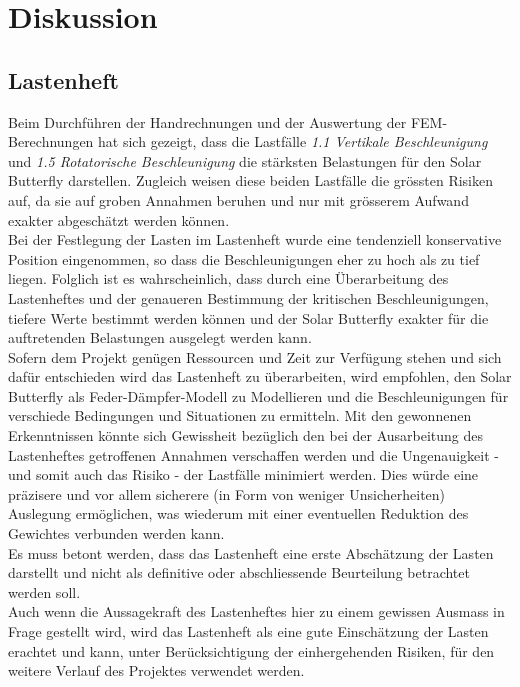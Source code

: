 \section{Diskussion}
\label{Diskussion}

\subsection{Lastenheft}
Beim Durchführen der Handrechnungen und der Auswertung der FEM-Berechnungen hat sich gezeigt, dass die Lastfälle \emph{1.1 Vertikale Beschleunigung} und \emph{1.5 Rotatorische Beschleunigung} die stärksten Belastungen für den Solar Butterfly darstellen. Zugleich weisen diese beiden Lastfälle die grössten Risiken auf, da sie auf groben Annahmen beruhen und nur mit grösserem Aufwand exakter abgeschätzt werden können.\\
Bei der Festlegung der Lasten im Lastenheft wurde eine tendenziell konservative Position eingenommen, so dass die Beschleunigungen eher zu hoch als zu tief liegen. Folglich ist es wahrscheinlich, dass durch eine Überarbeitung des Lastenheftes und der genaueren Bestimmung der kritischen Beschleunigungen, tiefere Werte bestimmt werden können und der Solar Butterfly exakter für die auftretenden Belastungen ausgelegt werden kann.\\
Sofern dem Projekt genügen Ressourcen und Zeit zur Verfügung stehen und sich dafür entschieden wird das Lastenheft zu überarbeiten, wird empfohlen, den Solar Butterfly als Feder-Dämpfer-Modell zu Modellieren und die Beschleunigungen für verschiede Bedingungen und Situationen zu ermitteln. Mit den gewonnenen Erkenntnissen könnte sich Gewissheit bezüglich den bei der Ausarbeitung des Lastenheftes getroffenen Annahmen verschaffen werden und die Ungenauigkeit - und somit auch das Risiko - der Lastfälle minimiert werden. Dies würde eine präzisere und vor allem sicherere (in Form von weniger Unsicherheiten) Auslegung ermöglichen, was wiederum mit einer eventuellen Reduktion des Gewichtes verbunden werden kann.\\
Es muss betont werden, dass das Lastenheft eine erste Abschätzung der Lasten darstellt und nicht als definitive oder abschliessende Beurteilung betrachtet werden soll.\\
Auch wenn die Aussagekraft des Lastenheftes hier zu einem gewissen Ausmass in Frage gestellt wird, wird das Lastenheft als eine gute Einschätzung der Lasten erachtet und kann, unter Berücksichtigung der einhergehenden Risiken, für den weitere Verlauf des Projektes verwendet werden.

